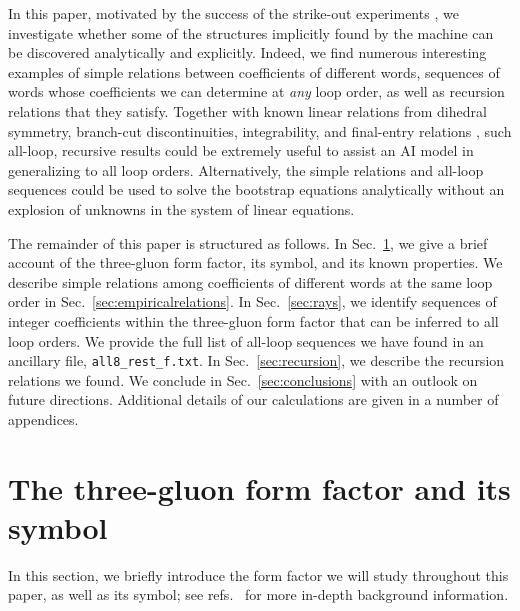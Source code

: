 \documentclass[12pt]{article}
\begin{document}
In this paper, motivated by the success of the strike-out experiments \citep{Cai:2024znx}, we investigate whether some of the structures implicitly found by the machine can be discovered analytically and explicitly. Indeed, we find numerous interesting examples of simple relations between coefficients of different words, sequences of words whose coefficients we can determine at \emph{any} loop order, as well as recursion relations that they satisfy.
Together with known linear relations from dihedral symmetry, branch-cut discontinuities, integrability, and final-entry relations \citep{Dixon:2022rse,Cai:2024znx}, 
 such all-loop, recursive results could be extremely useful to assist an AI model in generalizing to all loop orders.
 Alternatively, the simple relations and all-loop sequences could be used to solve the bootstrap equations analytically without an explosion of unknowns in the system of linear equations.

The remainder of this paper is structured as follows.
In Sec.~\ref{sec:formfactor}, we give a brief account of the three-gluon form factor, its symbol, and its known properties.
We describe simple relations among coefficients of different words at the same loop order in Sec.~\ref{sec:empiricalrelations}.
In Sec.~\ref{sec:rays},  we identify sequences of integer coefficients within the three-gluon form factor that can be inferred to all loop orders. 
We provide the full list of all-loop sequences we have found in an ancillary file, \texttt{all8\_rest\_f.txt}. 
In Sec.~\ref{sec:recursion}, we describe the recursion relations we found.
We conclude in Sec.~\ref{sec:conclusions} with an outlook on future directions.
Additional details of our calculations are given in a number of appendices.


\section{The three-gluon form factor and its symbol}\label{sec:formfactor}

In this section, we briefly introduce the form factor we will study throughout this paper, as well as its symbol; see refs.~\citep{Brandhuber:2011tv,Brandhuber:2012vm,Dixon:2020bbt,Dixon:2022rse} for more in-depth background information.
\end{document}
